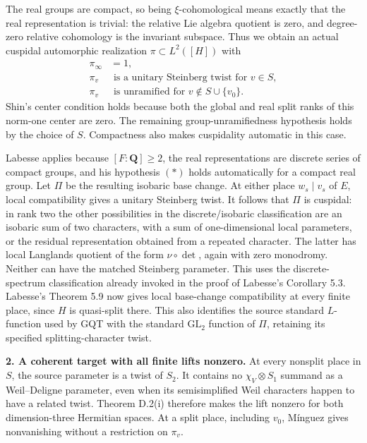 \documentclass[11pt,a4paper]{article}
\theoremstyle{definition}
\begin{document}
The real groups are compact, so being \(\xi\)-cohomological means exactly that the real representation is trivial: the relative Lie algebra quotient is zero, and degree-zero relative cohomology is the invariant subspace. Thus we obtain an actual cuspidal automorphic realization \(\pi\subset L^2([H])\) with \[
\begin{aligned}
\pi_\infty&=1,\\
\pi_v&\text{ is a unitary Steinberg twist for }v\in S,\\
\pi_v&\text{ is unramified for }v\notin S\cup\{v_0\}.
\end{aligned}
\] Shin's center condition holds because both the global and real split ranks of this norm-one center are zero. The remaining group-unramifiedness hypothesis holds by the choice of \(S\). Compactness also makes cuspidality automatic in this case.

Labesse applies because \([F:\mathbf Q]\ge2\), the real representations are discrete series of compact groups, and his hypothesis \((*)\) holds automatically for a compact real group. Let \(\Pi\) be the resulting isobaric base change. At either place \(w_s\mid v_s\) of \(E\), local compatibility gives a unitary Steinberg twist. It follows that \(\Pi\) is cuspidal: in rank two the other possibilities in the discrete/isobaric classification are an isobaric sum of two characters, with a sum of one-dimensional local parameters, or the residual representation obtained from a repeated character. The latter has local Langlands quotient of the form \(\nu\circ\det\), again with zero monodromy. Neither can have the matched Steinberg parameter. This uses the discrete-spectrum classification already invoked in the proof of Labesse's Corollary 5.3. Labesse's Theorem 5.9 now gives local base-change compatibility at every finite place, since \(H\) is quasi-split there. This also identifies the source standard \(L\)-function used by GQT with the standard \(\mathrm{GL}_2\) function of \(\Pi\), retaining its specified splitting-character twist.

\textbf{2. A coherent target with all finite lifts nonzero.} At every nonsplit place in \(S\), the source parameter is a twist of \(S_2\). It contains no \(\chi_V\otimes S_1\) summand as a Weil--Deligne parameter, even when its semisimplified Weil characters happen to have a related twist. Theorem D.2(i) therefore makes the lift nonzero for both dimension-three Hermitian spaces. At a split place, including \(v_0\), Mínguez gives nonvanishing without a restriction on \(\pi_v\).
\end{document}
